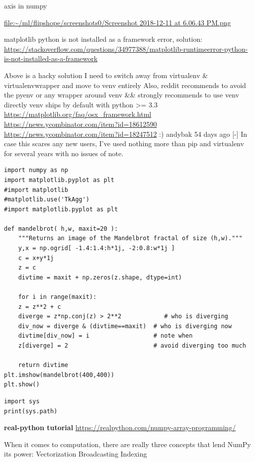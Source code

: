 \documentclass[11pt]{article}
\begin{document}
axis in numpy

\href{screenshots0/Screenshot\%202018-12-11\%20at\%206.06.43\%20PM.png}{file:\textasciitilde{}/ml/flipshope/screenshots0/Screenshot 2018-12-11 at 6.06.43 PM.png}

matplotlib python is not installed as a framework error, solution:
\url{https://stackoverflow.com/questions/34977388/matplotlib-runtimeerror-python-is-not-installed-as-a-framework}

Above is a hacky solution
I need to switch away from virtualenv \& virtualenvwrapper and move to venv entirely
Also, reddit recommends to avoid the pyenv or any wrapper around venv \&\& strongly recommends to use venv directly
venv ships by default with python >= 3.3
\url{https://matplotlib.org/faq/osx\_framework.html}
\url{https://news.ycombinator.com/item?id=18612590}
\url{https://news.ycombinator.com/item?id=18247512}
:) 	
andybak 54 days ago [-]
In case this scares any new users, I've used nothing more than pip and virtualenv for several years with no issues of note.



\begin{verbatim}
import numpy as np
import matplotlib.pyplot as plt
#import matplotlib  
#matplotlib.use('TkAgg')   
#import matplotlib.pyplot as plt 

def mandelbrot( h,w, maxit=20 ):
    """Returns an image of the Mandelbrot fractal of size (h,w)."""
    y,x = np.ogrid[ -1.4:1.4:h*1j, -2:0.8:w*1j ]
    c = x+y*1j
    z = c
    divtime = maxit + np.zeros(z.shape, dtype=int)

    for i in range(maxit):
	z = z**2 + c
	diverge = z*np.conj(z) > 2**2            # who is diverging
	div_now = diverge & (divtime==maxit)  # who is diverging now
	divtime[div_now] = i                  # note when
	z[diverge] = 2                        # avoid diverging too much

    return divtime
plt.imshow(mandelbrot(400,400))
plt.show()
\end{verbatim}

\begin{verbatim}
import sys
print(sys.path)
\end{verbatim}

\textbf{real-python tutorial}
\url{https://realpython.com/numpy-array-programming/}

When it comes to computation, there are really three concepts that lend NumPy its power:
Vectorization
Broadcasting
Indexing
\end{document}

